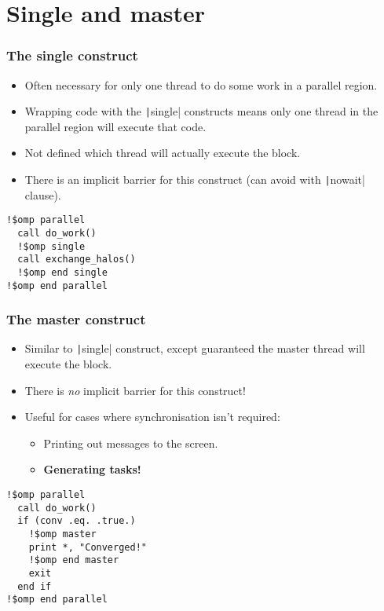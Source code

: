 \documentclass{beamer}
\begin{document}
\section{Single and master}
\begin{frame}[fragile]
\frametitle{The single construct}
\begin{itemize}
  \item Often necessary for only one thread to do some work in a parallel region.
  \item Wrapping code with the \texttt|single| constructs means only one thread in the parallel region will execute that code.
  \item Not defined which thread will actually execute the block.
  \item There is an implicit barrier for this construct (can avoid with \texttt|nowait| clause).
\end{itemize}

\begin{verbatim}
!$omp parallel
  call do_work()
  !$omp single
  call exchange_halos()
  !$omp end single
!$omp end parallel
\end{verbatim}
\end{frame}

\begin{frame}[fragile]
\frametitle{The master construct}
\begin{itemize}
  \item Similar to \texttt|single| construct, except guaranteed the master thread will execute the block.
  \item There is \emph{no} implicit barrier for this construct!
  \item Useful for cases where synchronisation isn't required:
    \begin{itemize}
      \item Printing out messages to the screen.
      \item {\bf Generating tasks!}
    \end{itemize}
\end{itemize}

\begin{verbatim}
!$omp parallel
  call do_work()
  if (conv .eq. .true.)
    !$omp master
    print *, "Converged!"
    !$omp end master
    exit
  end if
!$omp end parallel
\end{verbatim}
\end{frame}
\end{document}
